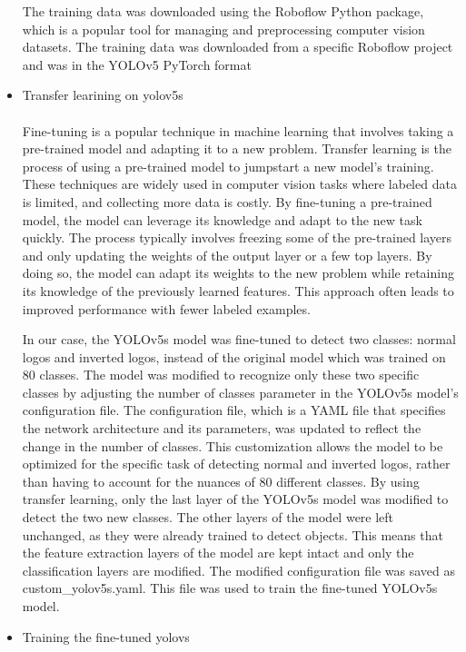 \begin{itemize}
\begin{lstlisting}[language=Python]
\end{lstlisting}
The training data was downloaded using the Roboflow Python package, which is a popular tool for managing and preprocessing computer vision datasets. The training data was downloaded from a specific Roboflow project and was in the YOLOv5 PyTorch format
\item{Transfer learining on yolov5s}\\
\\
Fine-tuning is a popular technique in machine learning that involves taking a pre-trained model and adapting it to a new problem. Transfer learning is the process of using a pre-trained model to jumpstart a new model's training. These techniques are widely used in computer vision tasks where labeled data is limited, and collecting more data is costly. By fine-tuning a pre-trained model, the model can leverage its knowledge and adapt to the new task quickly. The process typically involves freezing some of the pre-trained layers and only updating the weights of the output layer or a few top layers. By doing so, the model can adapt its weights to the new problem while retaining its knowledge of the previously learned features. This approach often leads to improved performance with fewer labeled examples.\cite{N22}

In our case, the YOLOv5s model was fine-tuned to detect two classes: normal logos and inverted logos, instead of the original model which was trained on 80 classes. The model was modified to recognize only these two specific classes by adjusting the number of classes parameter in the YOLOv5s model's configuration file. The configuration file, which is a YAML file that specifies the network architecture and its parameters, was updated to reflect the change in the number of classes. This customization allows the model to be optimized for the specific task of detecting normal and inverted logos, rather than having to account for the nuances of 80 different classes.
By using transfer learning, only the last layer of the YOLOv5s model was modified to detect the two new classes. The other layers of the model were left unchanged, as they were already trained to detect objects. This means that the feature extraction layers of the model are kept intact and only the classification layers are modified.
The modified configuration file was saved as custom\_yolov5s.yaml. This file was used to train the fine-tuned YOLOv5s model.
\item{Training the fine-tuned yolovs}


\end{itemize}
